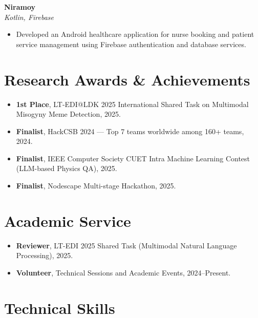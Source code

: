 \documentclass[a4paper,11pt]{article}
\newcommand{\project}[3]{
  \textbf{#1} \hfill \textit{#3}\\
  \textit{#2}\\[-0.25em]
}
\begin{document}
\project
{Niramoy}
{Kotlin, Firebase}
{}

\begin{itemize}
    \item Developed an Android healthcare application for nurse booking and
    patient service management using Firebase authentication and database
    services.
\end{itemize}

\section*{Research Awards \& Achievements}

\begin{itemize}
    \item \textbf{1st Place}, LT-EDI@LDK 2025 International Shared Task on
    Multimodal Misogyny Meme Detection, 2025.
    \item \textbf{Finalist}, HackCSB 2024 --- Top 7 teams worldwide among
    160+ teams, 2024.
    \item \textbf{Finalist}, IEEE Computer Society CUET Intra Machine
    Learning Contest (LLM-based Physics QA), 2025.
    \item \textbf{Finalist}, Nodescape Multi-stage Hackathon, 2025.
\end{itemize}

\section*{Academic Service}

\begin{itemize}
    \item \textbf{Reviewer}, LT-EDI 2025 Shared Task (Multimodal Natural
    Language Processing), 2025.
    \item \textbf{Volunteer}, Technical Sessions and Academic Events,
    2024--Present.
\end{itemize}

\section*{Technical Skills}
\end{document}
